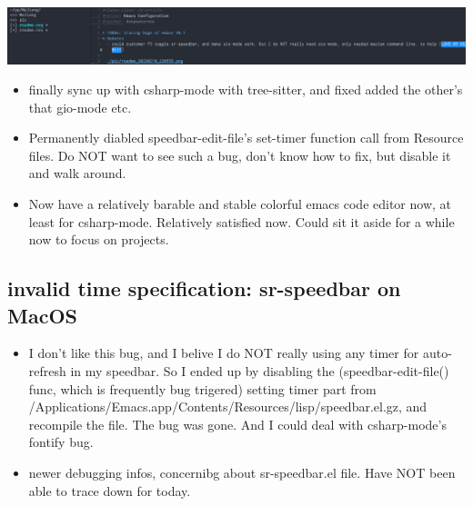 \documentclass[9pt, b5paper]{article}
\begin{document}
\begin{center}
\includegraphics[width=.9\linewidth]{./pic/readme_20230210_221127.png}
\end{center}
\begin{itemize}
\item finally sync up with csharp-mode with tree-sitter, and fixed added the other's that gio-mode etc.
\item Permanently diabled speedbar-edit-file's set-timer function call from Resource files. Do NOT want to see such a bug, don't know how to fix, but disable it and walk around.
\item Now have a relatively barable and stable colorful emacs code editor now, at least for csharp-mode. Relatively satisfied now. Could sit it aside for a while now to focus on projects.
\end{itemize}
\subsection{invalid time specification: sr-speedbar on MacOS}
\label{sec:org450051b}
\begin{itemize}
\item I don't like this bug, and I belive I do NOT really using any timer for auto-refresh in my speedbar. So I ended up by disabling the (speedbar-edit-file() func, which is frequently bug trigered) setting timer part from /Applications/Emacs.app/Contents/Resources/lisp/speedbar.el.gz, and recompile the file. The bug was gone. And I could deal with csharp-mode's fontify bug.
\item newer debugging infos, concernibg about sr-speedbar.el file. Have NOT been able to trace down for today.
\end{itemize}
\end{document}
